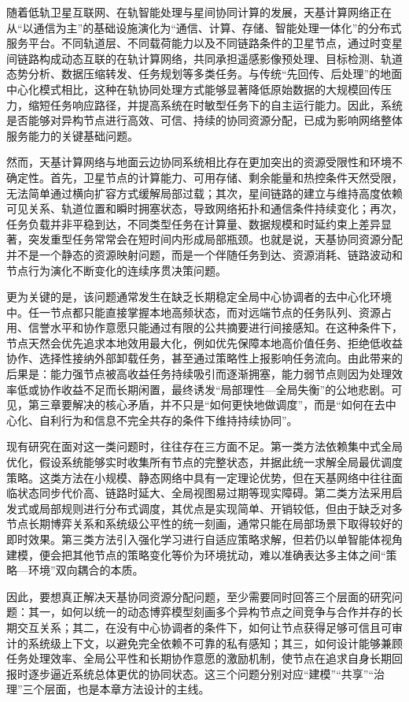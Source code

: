 \documentclass[UTF8,12pt,oneside]{ctexbook}
\begin{document}
随着低轨卫星互联网、在轨智能处理与星间协同计算的发展，天基计算网络正在从“以通信为主”的基础设施演化为“通信、计算、存储、智能处理一体化”的分布式服务平台。不同轨道层、不同载荷能力以及不同链路条件的卫星节点，通过时变星间链路构成动态互联的在轨计算网络，共同承担遥感影像预处理、目标检测、轨道态势分析、数据压缩转发、任务规划等多类任务。与传统“先回传、后处理”的地面中心化模式相比，这种在轨协同处理方式能够显著降低原始数据的大规模回传压力，缩短任务响应路径，并提高系统在时敏型任务下的自主运行能力。因此，系统是否能够对异构节点进行高效、可信、持续的协同资源分配，已成为影响网络整体服务能力的关键基础问题。

然而，天基计算网络与地面云边协同系统相比存在更加突出的资源受限性和环境不确定性。首先，卫星节点的计算能力、可用存储、剩余能量和热控条件天然受限，无法简单通过横向扩容方式缓解局部过载；其次，星间链路的建立与维持高度依赖可见关系、轨道位置和瞬时拥塞状态，导致网络拓扑和通信条件持续变化；再次，任务负载并非平稳到达，不同类型任务在计算量、数据规模和时延约束上差异显著，突发重型任务常常会在短时间内形成局部瓶颈。也就是说，天基协同资源分配并不是一个静态的资源映射问题，而是一个伴随任务到达、资源消耗、链路波动和节点行为演化不断变化的连续序贯决策问题。

更为关键的是，该问题通常发生在缺乏长期稳定全局中心协调者的去中心化环境中。任一节点都只能直接掌握本地高频状态，而对远端节点的任务队列、资源占用、信誉水平和协作意愿只能通过有限的公共摘要进行间接感知。在这种条件下，节点天然会优先追求本地效用最大化，例如优先保障本地高价值任务、拒绝低收益协作、选择性接纳外部卸载任务，甚至通过策略性上报影响任务流向。由此带来的后果是：能力强节点被高收益任务持续吸引而逐渐拥塞，能力弱节点则因为处理效率低或协作收益不足而长期闲置，最终诱发“局部理性—全局失衡”的公地悲剧。可见，第三章要解决的核心矛盾，并不只是“如何更快地做调度”，而是“如何在去中心化、自利行为和信息不完全共存的条件下维持持续协同”。

现有研究在面对这一类问题时，往往存在三方面不足。第一类方法依赖集中式全局优化，假设系统能够实时收集所有节点的完整状态，并据此统一求解全局最优调度策略。这类方法在小规模、静态网络中具有一定理论优势，但在天基网络中往往面临状态同步代价高、链路时延大、全局视图易过期等现实障碍。第二类方法采用启发式或局部规则进行分布式调度，其优点是实现简单、开销较低，但由于缺乏对多节点长期博弈关系和系统级公平性的统一刻画，通常只能在局部场景下取得较好的即时效果。第三类方法引入强化学习进行自适应策略求解，但若仍以单智能体视角建模，便会把其他节点的策略变化等价为环境扰动，难以准确表达多主体之间“策略—环境”双向耦合的本质。

因此，要想真正解决天基协同资源分配问题，至少需要同时回答三个层面的研究问题：其一，如何以统一的动态博弈模型刻画多个异构节点之间竞争与合作并存的长期交互关系；其二，在没有中心协调者的条件下，如何让节点获得足够可信且可审计的系统级上下文，以避免完全依赖不可靠的私有感知；其三，如何设计能够兼顾任务处理效率、全局公平性和长期协作意愿的激励机制，使节点在追求自身长期回报时逐步逼近系统总体更优的协同状态。这三个问题分别对应“建模”“共享”“治理”三个层面，也是本章方法设计的主线。
\end{document}
